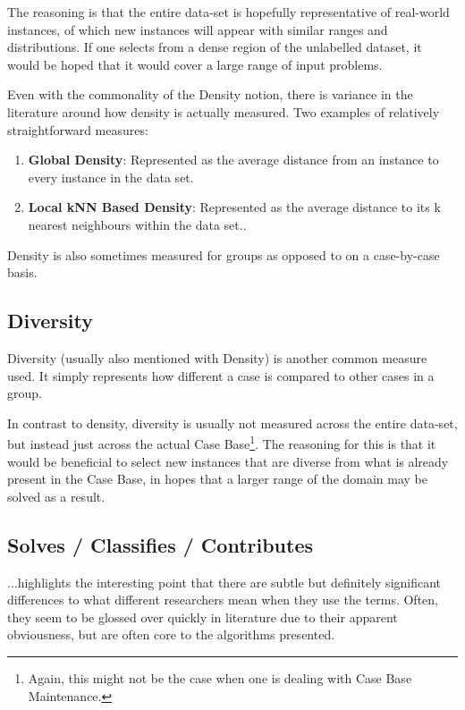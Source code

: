 \documentclass[a4paper,11pt]{report}
\begin{document}
The reasoning is that the entire data-set is hopefully representative of real-world instances, of which new instances will appear with similar ranges and distributions. If one selects from a dense region of the unlabelled dataset, it would be hoped that it would cover a large range of input problems.

Even with the commonality of the Density notion, there is variance in the literature around how density is actually measured. Two examples of relatively straightforward measures:
\begin{enumerate}
	\item \textbf{Global Density}: Represented as the average distance from an instance to every  instance in the data set\cite{Xu2007}.
	\item \textbf{Local kNN Based Density}: Represented as the average distance to its k nearest neighbours within the data set.\cite{Zhu2008}.
\end{enumerate}

Density is also sometimes measured for groups as opposed to on a case-by-case basis\cite{Smyth1998}.

\subsection{Diversity}

Diversity (usually also mentioned with Density) is another common measure used. It simply represents how different a case is compared to other cases in a group.

In contrast to density, diversity is usually not measured across the entire data-set, but instead just across the actual Case Base\footnote{Again, this might not be the case when one is dealing with Case Base Maintenance.}. The reasoning for this is that it would be beneficial to select new instances that are diverse from what is already present in the Case Base, in hopes that a larger range of the domain may be solved as a result. 

\subsection{Solves / Classifies / Contributes}

...highlights the interesting point that there are subtle but definitely significant differences to what different researchers mean when they use the terms. Often, they seem to be glossed over quickly in literature due to their apparent obviousness, but are often core to the algorithms presented.
\end{document}
